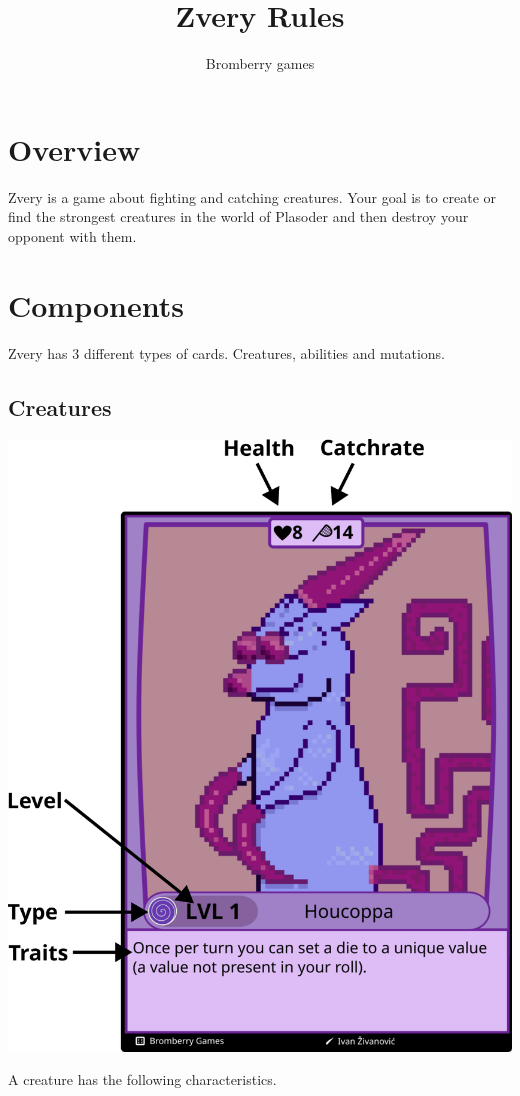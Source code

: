 \documentclass[a4paper,12pt]{article}
\author{Bromberry games}
\title{Zvery Rules}
\begin{document}
\maketitle

\section{Overview}
Zvery is a game about fighting and catching creatures.
Your goal is to create or find the strongest creatures in the world of Plasoder and then destroy your opponent with them.
\section{Components}
Zvery has 3 different types of cards.
Creatures, abilities and mutations.
\subsection{Creatures}
\begin{center}
	\includegraphics[scale=0.45]{./media/creature_explained}
\end{center}
A creature has the following characteristics.
\end{document}
